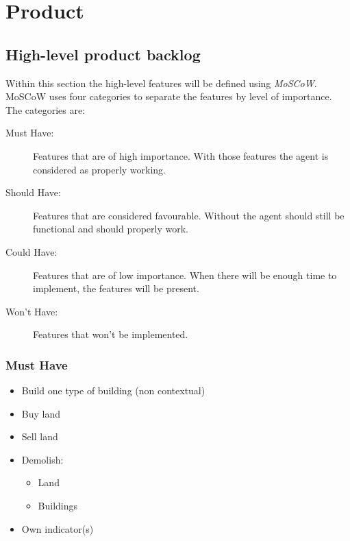 \label{product}
\section{Product}

\subsection{High-level product backlog}

Within this section the high-level features will be defined using \textit{MoSCoW}. MoSCoW uses four categories to separate the features by level of importance. The categories are:

\begin{description}
	\item[Must Have:] Features that are of high importance. With those features the agent is considered as properly working.
	\item[Should Have:] Features that are considered favourable. Without the agent should still be functional and should properly work.
	\item[Could Have:] Features that are of low importance. When there will be enough time to implement, the features will be present.
	\item[Won't Have:] Features that won't be implemented.
\end{description}

\subsubsection{Must Have}
\begin{itemize}
	\item Build one type of building (non contextual)
	\item Buy land
	\item Sell land
	\item Demolish:
		\begin{itemize}
			\item Land
			\item Buildings
		\end{itemize}
	\item Own indicator(s)
\end{itemize}

